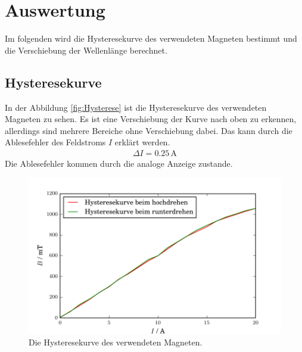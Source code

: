 \newpage
\section{Auswertung}
\label{sec:Auswertung}
Im folgenden wird die Hysteresekurve des verwendeten Magneten bestimmt und die Verschiebung der Wellenlänge berechnet.



\subsection{Hysteresekurve}
In der Abbildung \eqref{fig:Hysterese} ist die Hysteresekurve des verwendeten Magneten zu sehen. Es ist eine Verschiebung der Kurve nach oben zu erkennen, allerdings sind mehrere Bereiche ohne Verschiebung dabei. Das kann durch die Ablesefehler des Feldstroms $I$ erklärt werden.
\begin{align*}
  \Delta I = 0.25\, \text{A}
\end{align*}
Die Ablesefehler kommen durch die analoge Anzeige zustande.

\begin{figure}[H]
  \centering
  \includegraphics[width=\linewidth]{Bilder/Hysterese.pdf}
  \caption{Die Hysteresekurve des verwendeten Magneten.}
  \label{fig:Hysterese}
\end{figure}



